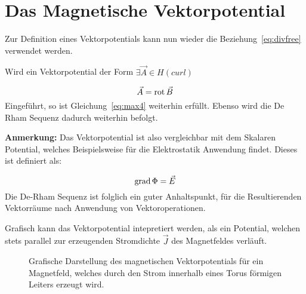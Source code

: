 \section{Das Magnetische Vektorpotential}
Zur Definition eines Vektorpotentials kann nun wieder die Beziehung~\ref{eq:divfree} verwendet werden. 
\par
Wird ein Vektorpotential der Form $\exists\vec{A}\in H(curl)$
\par
\begin{equation}
	\vec{A} = \mathrm{rot}\,\vec{B}
\end{equation}
Eingef\"uhrt, so ist Gleichung~\ref{eq:max4} weiterhin erf\"ullt. Ebenso wird die De Rham Sequenz dadurch weiterhin befolgt. 
\par
\textbf{Anmerkung:} Das Vektorpotential ist also vergleichbar mit dem Skalaren Potential, welches Beispielsweise f\"ur die Elektrostatik Anwendung findet. Dieses ist definiert als:
\par
\begin{equation}
	\mathrm{grad}\, \Phi = \vec{E}
\end{equation}
Die De-Rham Sequenz ist folglich ein guter Anhaltspunkt, f\"ur die Resultierenden Vektorr\"aume nach Anwendung von Vektoroperationen.

\newpage

Grafisch kann das Vektorpotential intepretiert werden, als ein Potential, welchen stets parallel zur erzeugenden Stromdichte $\vec{J}$ des Magnetfeldes verl\"auft.
\begin{figure}[h]
	\centering
	\def\svgwidth{0.7\textwidth}
	
	\caption{Grafische Darstellung des magnetischen Vektorpotentials f\"ur ein Magnetfeld, welches durch den Strom innerhalb eines Torus f\"ormigen Leiters erzeugt wird.}
	\label{fig:vecpot}
	
\end{figure}

